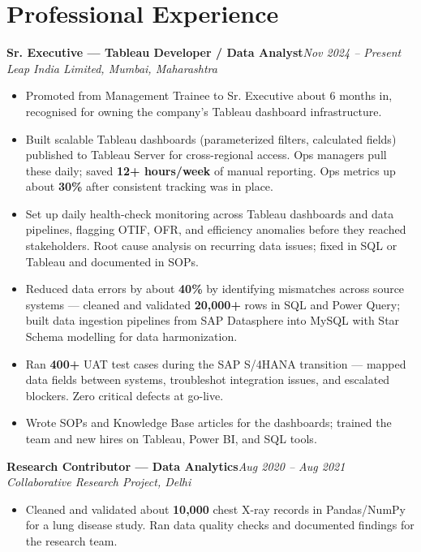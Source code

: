 \documentclass[10pt, letterpaper]{article}
\newcommand{\role}[3]{%
  \vspace{2pt}%
  {\bfseries #1}\hfill{\small\color{muted}\textit{#3}}\\[-2pt]%
  {\small\color{muted}\textit{#2}}%
}
\begin{document}
\section{Professional Experience}

\role{Sr. Executive --- Tableau Developer / Data Analyst}{Leap India Limited, Mumbai, Maharashtra}{Nov 2024 -- Present}

\begin{itemize}
  \item Promoted from Management Trainee to Sr. Executive about 6 months in, recognised for owning the company's Tableau dashboard infrastructure.
  \item Built scalable Tableau dashboards (parameterized filters, calculated fields) published to Tableau Server for cross-regional access. Ops managers pull these daily; saved \textbf{12+ hours/week} of manual reporting. Ops metrics up about \textbf{30\%} after consistent tracking was in place.
  \item Set up daily health-check monitoring across Tableau dashboards and data pipelines, flagging OTIF, OFR, and efficiency anomalies before they reached stakeholders. Root cause analysis on recurring data issues; fixed in SQL or Tableau and documented in SOPs.
  \item Reduced data errors by about \textbf{40\%} by identifying mismatches across source systems --- cleaned and validated \textbf{20,000+} rows in SQL and Power Query; built data ingestion pipelines from SAP Datasphere into MySQL with Star Schema modelling for data harmonization.
  \item Ran \textbf{400+} UAT test cases during the SAP S/4HANA transition --- mapped data fields between systems, troubleshot integration issues, and escalated blockers. Zero critical defects at go-live.
  \item Wrote SOPs and Knowledge Base articles for the dashboards; trained the team and new hires on Tableau, Power BI, and SQL tools.
\end{itemize}

\vspace{1pt}

\role{Research Contributor --- Data Analytics}{Collaborative Research Project, Delhi}{Aug 2020 -- Aug 2021}

\begin{itemize}
  \item Cleaned and validated about \textbf{10,000} chest X-ray records in Pandas/NumPy for a lung disease study. Ran data quality checks and documented findings for the research team.
\end{itemize}
\end{document}

